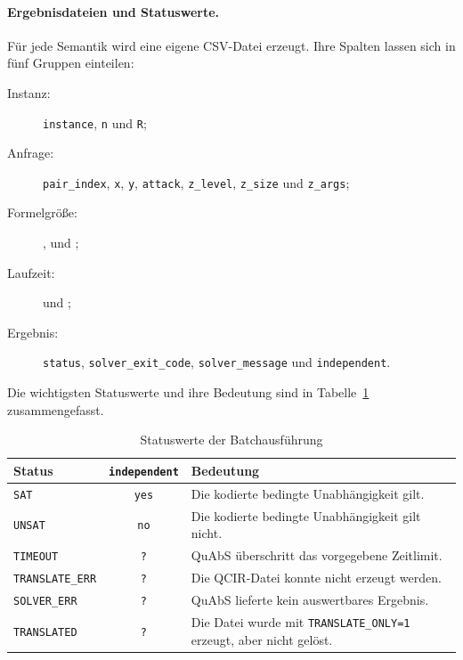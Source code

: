 \paragraph{Ergebnisdateien und Statuswerte.}
Für jede Semantik wird eine eigene CSV-Datei erzeugt. Ihre Spalten
lassen sich in fünf Gruppen einteilen:
\begin{description}
    \item[Instanz:]
        \texttt{instance}, \texttt{n} und \texttt{R};
    \item[Anfrage:]
        \texttt{pair\_index}, \texttt{x}, \texttt{y},
        \texttt{attack}, \texttt{z\_level}, \texttt{z\_size} und
        \texttt{z\_args};
    \item[Formelgröße:]
        ,  und ;
    \item[Laufzeit:]
         und ;
    \item[Ergebnis:]
        \texttt{status}, \texttt{solver\_exit\_code},
        \texttt{solver\_message} und \texttt{independent}.
\end{description}
Die wichtigsten Statuswerte und ihre Bedeutung sind in
Tabelle~\ref{tab:appendix-qbf-status} zusammengefasst.
\begin{table}[htb]
    \centering
    \begin{tabularx}{\textwidth}{@{}lcX@{}}
        \toprule
        Status & \texttt{independent} & Bedeutung\\
        \midrule
        \texttt{SAT} & \texttt{yes}
            & Die kodierte bedingte Unabhängigkeit gilt.\\
        \texttt{UNSAT} & \texttt{no}
            & Die kodierte bedingte Unabhängigkeit gilt nicht.\\
        \texttt{TIMEOUT} & \texttt{?}
            & QuAbS überschritt das vorgegebene Zeitlimit.\\
        \texttt{TRANSLATE\_ERR} & \texttt{?}
            & Die QCIR-Datei konnte nicht erzeugt werden.\\
        \texttt{SOLVER\_ERR} & \texttt{?}
            & QuAbS lieferte kein auswertbares Ergebnis.\\
        \texttt{TRANSLATED} & \texttt{?}
            & Die Datei wurde mit
              \texttt{TRANSLATE\_ONLY=1} erzeugt, aber nicht gelöst.\\
        \bottomrule
    \end{tabularx}
    \caption{Statuswerte der Batchausführung}
    \label{tab:appendix-qbf-status}
\end{table}

